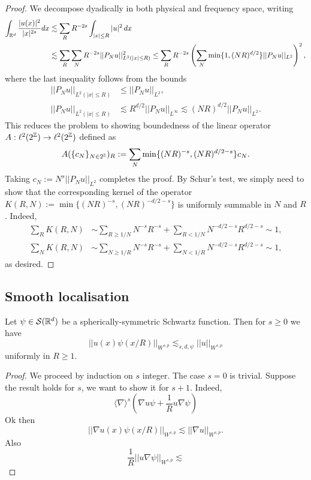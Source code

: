 \begin{proof}
	We decompose dyadically in both physical and frequency space, writing 
		\begin{align*}
			\int_{\mathbb R^d} \frac{|u(x)|^2}{|x|^{2s}} dx 
				&\lesssim \sum_R R^{-2s} \int_{|x| \leq R} |u|^2 \, dx \\
				&\lesssim \sum_R \sum_N R^{-2s} ||P_N u||_{L^2 (|x| \leq R)}^2 \leq  \sum_R  R^{-2s} \left(\sum_N \min\{ 1, (NR)^{d/2} \} ||P_N u||_{L^2}\right)^2 ,
		\end{align*}
	where the last inequality follows from the bounds
		\begin{align*}
			||P_N u||_{L^2 (|x| \leq R)} 
				&\leq ||P_N u||_{L^2} ,\\
			||P_N u||_{L^2 (|x| \leq R)}
				&\lesssim R^{d/2} ||P_N u||_{L^\infty} \lesssim (NR)^{d/2} ||P_N u||_{L^2}.
		\end{align*}	
	This reduces the problem to showing boundedness of the linear operator $A : \ell^2 (2^\mathbb Z) \to \ell^2 (2^\mathbb Z)$ defined as
		\[ A(\{c_N\}_{N \in 2^\mathbb Z})_R := \sum_N \min \{ (NR)^{-s}, (NR)^{d/2 - s} \} c_N. \]
	Taking $c_N := N^s ||P_N u||_{L^2}$ completes the proof. By Schur's test, we simply need to show that the corresponding kernel of the operator $K(R, N) :=  \min \{ (NR)^{-s}, (NR)^{-d/2 - s} \}$ is uniformly summable in $N$ and $R$. Indeed, 
		\begin{align*}
			\sum_{R} K(R, N) 
				&\sim \sum_{R \geq 1/N} N^{-s} R^{-s} + \sum_{R < 1/N} N^{-d/2 - s} R^{d/2- s} \sim 1, \\
			\sum_{N} K(R, N) 
				&\sim \sum_{N \geq 1/R} N^{-s} R^{-s} + \sum_{N < 1/R} N^{-d/2 - s} R^{d/2- s} \sim 1	,
		\end{align*}
	as desired. 
\end{proof}

\subsection{Smooth localisation}

\begin{proposition}
	Let $\psi \in \mathcal S (\mathbb R^d)$ be a spherically-symmetric Schwartz function. Then for $s \geq 0$ we have 
		\[ ||u(x) \psi(x/R) ||_{W^{s, p}} \lesssim_{s, d, \psi} ||u||_{W^{s, p}} \]
	uniformly in $R \geq 1$. 
\end{proposition}

\begin{proof}
	We proceed by induction on $s$ integer. The case $s = 0$ is trivial. Suppose the result holds for $s$, we want to show it for $s + 1$. Indeed, 
		\[
			\langle \nabla \rangle^s (\nabla u \psi + \frac1R u \nabla \psi)
		\]
	Ok then 
		\[
			||\nabla u(x) \psi(x/R)||_{W^{s, p}} \lesssim ||\nabla u||_{W^{s, p}}.
		\]	
	Also
		\[
			\frac1R || u \nabla \psi ||_{W^{s, p}} \lesssim 
		\]	
\end{proof}
